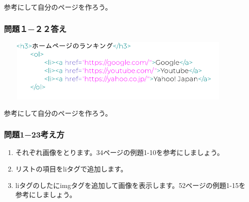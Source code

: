 \documentclass[a4paper,12pt]{jarticle}
\begin{document}
\bigskip

参考にして自分のページを作ろう。


\bigskip

\subsubsection{\bfseries
問題１−２２答え}


\centering
\includegraphics[width=12.448cm,height=3.129cm]{textbook-img241.png}
\flushleft

\bigskip

\centering
{}
\flushleft

\bigskip
参考にして自分のページを作ろう。

\clearpage\subsubsection{\bfseries
問題1−23考え方}

\begin{enumerate}
\item
それぞれ画像をとります。34ページの例題1-10を参考にしましょう。
\item リストの項目をliタグで追加します。
\item
liタグのしたにimgタグを追加して画像を表示します。52ページの例題1-15を参考にしましょう。
\end{enumerate}
\centering
{}
\flushleft
\end{document}

